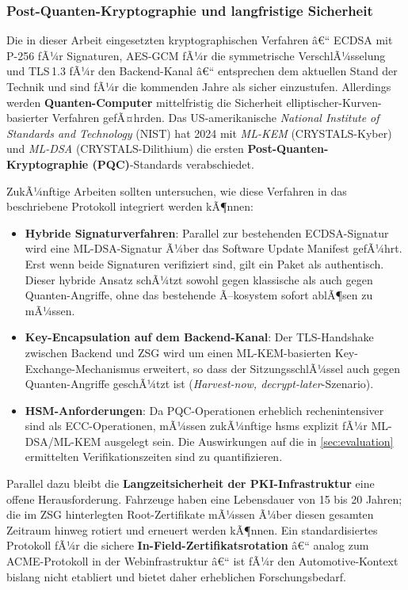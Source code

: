 ﻿\documentclass[12pt,a4paper,twoside]{article}
\begin{document}
\subsubsection{Post-Quanten-Kryptographie und langfristige Sicherheit}

Die in dieser Arbeit eingesetzten kryptographischen Verfahren â€“
ECDSA mit P-256 fÃ¼r Signaturen, AES-GCM fÃ¼r die symmetrische
VerschlÃ¼sselung und TLS\,1.3 fÃ¼r den Backend-Kanal â€“ entsprechen dem
aktuellen Stand der Technik und sind fÃ¼r die kommenden Jahre als sicher
einzustufen. Allerdings werden \textbf{Quanten-Computer} mittelfristig
die Sicherheit elliptischer-Kurven-basierter Verfahren gefÃ¤hrden.
Das US-amerikanische \textit{National Institute of Standards and
Technology} (NIST) hat 2024 mit \textit{ML-KEM} (CRYSTALS-Kyber)
und \textit{ML-DSA} (CRYSTALS-Dilithium) die ersten
\textbf{Post-Quanten-Kryptographie (PQC)}-Standards verabschiedet.

ZukÃ¼nftige Arbeiten sollten untersuchen, wie diese Verfahren in das
beschriebene Protokoll integriert werden kÃ¶nnen:
\begin{itemize}
  \item \textbf{Hybride Signaturverfahren}: Parallel zur bestehenden
    ECDSA-Signatur wird eine ML-DSA-Signatur Ã¼ber das Software Update
    Manifest gefÃ¼hrt. Erst wenn beide Signaturen verifiziert sind, gilt
    ein Paket als authentisch. Dieser hybride Ansatz schÃ¼tzt sowohl
    gegen klassische als auch gegen Quanten-Angriffe,
    ohne das bestehende Ã–kosystem sofort ablÃ¶sen zu mÃ¼ssen.
  \item \textbf{Key-Encapsulation auf dem Backend-Kanal}:
    Der TLS-Handshake zwischen Backend und ZSG wird um einen
    ML-KEM-basierten Key-Exchange-Mechanismus erweitert,
    so dass der SitzungsschlÃ¼ssel auch gegen Quanten-Angriffe
    geschÃ¼tzt ist (\textit{Harvest-now, decrypt-later}-Szenario).
  \item \textbf{HSM-Anforderungen}: Da PQC-Operationen erheblich
    rechenintensiver sind als ECC-Operationen, mÃ¼ssen zukÃ¼nftige
    \glspl{hsm} explizit fÃ¼r ML-DSA/ML-KEM ausgelegt sein.
    Die Auswirkungen auf die in \cref{sec:evaluation} ermittelten
    Verifikationszeiten sind zu quantifizieren.
\end{itemize}

Parallel dazu bleibt die \textbf{Langzeitsicherheit der
PKI-Infrastruktur} eine offene Herausforderung. Fahrzeuge haben
eine Lebensdauer von 15 bis 20 Jahren; die im ZSG hinterlegten
Root-Zertifikate mÃ¼ssen Ã¼ber diesen gesamten Zeitraum hinweg
rotiert und erneuert werden kÃ¶nnen. Ein standardisiertes Protokoll
fÃ¼r die sichere \textbf{In-Field-Zertifikatsrotation} â€“
analog zum ACME-Protokoll in der Webinfrastruktur â€“ ist fÃ¼r
den Automotive-Kontext bislang nicht etabliert und bietet
daher erheblichen Forschungsbedarf.
\end{document}
